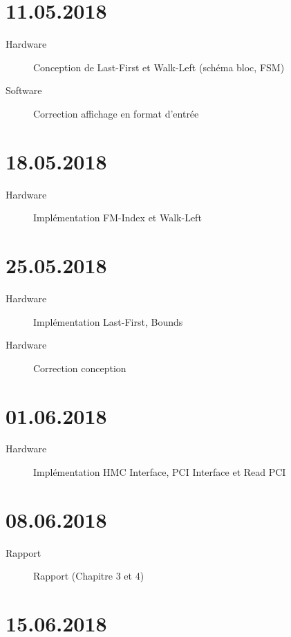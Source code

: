 \section*{11.05.2018}

\begin{description}
	\item [Hardware] Conception de Last-First et Walk-Left (schéma bloc, FSM)
	\item [Software] Correction affichage en format d'entrée
\end{description}

\section*{18.05.2018}

\begin{description}
	\item [Hardware] Implémentation FM-Index et Walk-Left 
\end{description}

\section*{25.05.2018}

\begin{description}
	\item [Hardware] Implémentation Last-First, Bounds 
	\item [Hardware] Correction conception
\end{description}


\section*{01.06.2018}

\begin{description}
	\item [Hardware] Implémentation HMC Interface, PCI Interface et Read PCI
\end{description}


\section*{08.06.2018}

\begin{description}
	\item [Rapport] Rapport (Chapitre 3 et 4)
\end{description}

\section*{15.06.2018}

